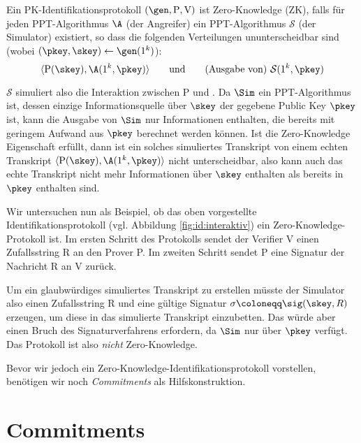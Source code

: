 \begin{definition}
  \label{def:zk}
  Ein PK-Identifikationsprotokoll $(\gen, \mathrm{P}, \mathrm{V})$ ist
  Zero-Knowledge (ZK), falls für jeden PPT-Algorithmus $\A$ (der
  Angreifer) ein PPT-Algorithmus $\mathcal{S}$ (der Simulator) existiert,
  so dass die folgenden Verteilungen ununterscheidbar sind (wobei
  $(\pkey, \skey) \leftarrow \gen(1^k)$):
  \[
    \langle \mathrm{P}(\skey), \A(1^k, \pkey) \rangle \text{\qquad und\qquad (Ausgabe von) } \mathcal{S}(1^k, \pkey)
  \]
\end{definition}

$\mathcal{S}$ simuliert also die Interaktion zwischen P und \A. Da
$\Sim$ ein PPT-Algorithmus ist, dessen einzige Informationsquelle über
$\skey$ der gegebene Public Key $\pkey$ ist, kann die Ausgabe von $\Sim$
nur Informationen enthalten, die bereits mit geringem Aufwand aus
$\pkey$ berechnet werden können. Ist die Zero-Knowledge Eigenschaft
erfüllt, dann ist ein solches simuliertes Transkript von einem echten
Transkript $\langle \mathrm{P}(\skey), \A(1^k, \pkey) \rangle$ nicht
unterscheidbar, also kann auch das echte Transkript nicht mehr
Informationen über $\skey$ enthalten als bereits in $\pkey$ enthalten
sind.

Wir untersuchen nun als Beispiel, ob das oben vorgestellte
Identifikationsprotokoll (vgl. Abbildung \ref{fig:id:interaktiv}) ein
Zero-Knowledge-Protokoll ist. Im ersten Schritt des Protokolls sendet
der Verifier V einen Zufallsstring R an den Prover P. Im zweiten Schritt
sendet P eine Signatur der Nachricht R an V zurück.

Um ein glaubwürdiges simuliertes Transkript zu erstellen müsste der
Simulator also einen Zufallsstring R und eine gültige Signatur $\sigma
\coloneqq \sig(\skey, R)$ erzeugen, um diese in das simulierte Transkript
einzubetten. Das würde aber einen Bruch des Signaturverfahrens
erfordern, da $\Sim$ nur über $\pkey$ verfügt. Das Protokoll ist also
\emph{nicht} Zero-Knowledge.

Bevor wir jedoch ein Zero-Knowledge-Identifikationsprotokoll vorstellen,
benötigen wir noch \emph{Commitments} als Hilfskonstruktion.
\section{Commitments}

